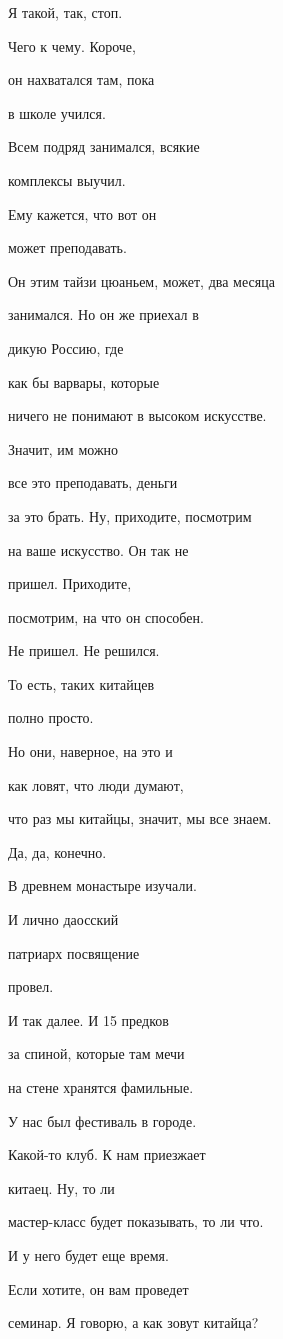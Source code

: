 Я такой, так, стоп.

Чего к чему. Короче,

он нахватался там, пока

в школе учился.

Всем подряд занимался, всякие

комплексы выучил.

Ему кажется, что вот он

может преподавать.

Он этим тайзи цюаньем, может, два месяца

занимался. Но он же приехал в

дикую Россию, где

как бы варвары, которые

ничего не понимают в высоком искусстве.

Значит, им можно

все это преподавать, деньги

за это брать. Ну, приходите, посмотрим

на ваше искусство. Он так не

пришел. Приходите,

посмотрим, на что он способен.

Не пришел. Не решился.

То есть, таких китайцев

полно просто.

Но они, наверное, на это и

как ловят, что люди думают,

что раз мы китайцы, значит, мы все знаем.

Да, да, конечно.

В древнем монастыре изучали.

И лично даосский

патриарх посвящение

провел.

И так далее. И 15 предков

за спиной, которые там мечи

на стене хранятся фамильные.

У нас был фестиваль в городе.

Какой-то клуб. К нам приезжает

китаец. Ну, то ли

мастер-класс будет показывать, то ли что.

И у него будет еще время.

Если хотите, он вам проведет

семинар. Я говорю, а как зовут китайца?

